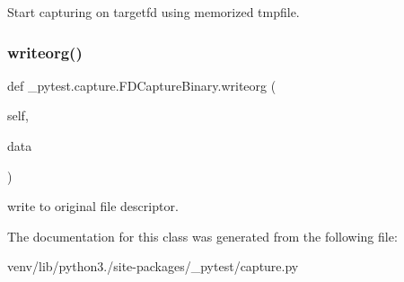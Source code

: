 \begin{DoxyVerb}Start capturing on targetfd using memorized tmpfile. \end{DoxyVerb}
 \mbox{\label{class__pytest_1_1capture_1_1_f_d_capture_binary_a574b9bd489894a42476661b0c08de6bd}} 
\subsubsection{\texorpdfstring{writeorg()}{writeorg()}}
{\footnotesize\ttfamily def \+\_\+pytest.\+capture.\+F\+D\+Capture\+Binary.\+writeorg (\begin{DoxyParamCaption}\item[{}]{self,  }\item[{}]{data }\end{DoxyParamCaption})}

\begin{DoxyVerb}write to original file descriptor. \end{DoxyVerb}
 

The documentation for this class was generated from the following file\+:\begin{DoxyCompactItemize}
\item 
venv/lib/python3./site-\/packages/\+\_\+pytest/capture.\+py\end{DoxyCompactItemize}
